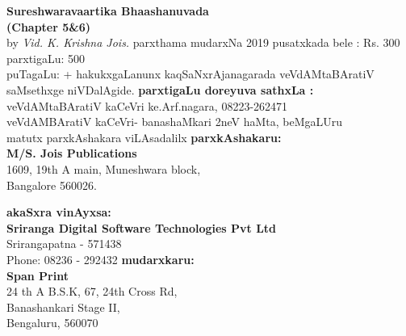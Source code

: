 \thispagestyle{empty}
\begin{flushleft}
{\rm{\textbf{Sureshwaravaartika Bhaashanuvada \\\small{(Chapter 5\&6)}}\\by \textit{Vid. K. Krishna Jois.}}}
\vfill
parxthama mudarxNa {\rm {2019}}
\vfill
pusatxkada bele : {\rm {Rs. 300}}\\
parxtigaLu: {\rm {500}}\\
puTagaLu: {\rm\pageref{prelims:end}+\pageref{book:end}}
\vfill
hakukxgaLanunx kaqSaNxrAjanagarada veVdAMtaBAratiV saMsethxge niVDalAgide. 
\vfill
\textbf{parxtigaLu doreyuva sathxLa :}\\
veVdAMtaBAratiV kaCeVri ke.Arf.nagara, {\rm 08223-262471}\\
veVdAMBAratiV kaCeVri- banashaMkari 2neV haMta, beMgaLUru\\
matutx parxkAshakara viLAsadalilx
\vfill
\textbf{parxkAshakaru:}\\
{\rm {\textbf{M/S. Jois Publications} \\
1609, 19th A main, Muneshwara block,\\
Bangalore 560026.}}

\vfill
\textbf{akaSxra vinAyxsa:}\\ {\rm{\textbf{Sriranga Digital Software Technologies Pvt Ltd}\\ Srirangapatna - 571438\\ Phone: 08236 - 292432}}
\vfill
\textbf{mudarxkaru:}\\ {\rm{\textbf{Span Print}\\ 24 th A B.S.K, 67, 24th Cross Rd,\\ Banashankari Stage II,\\ Bengaluru, 560070}}

\end{flushleft}
